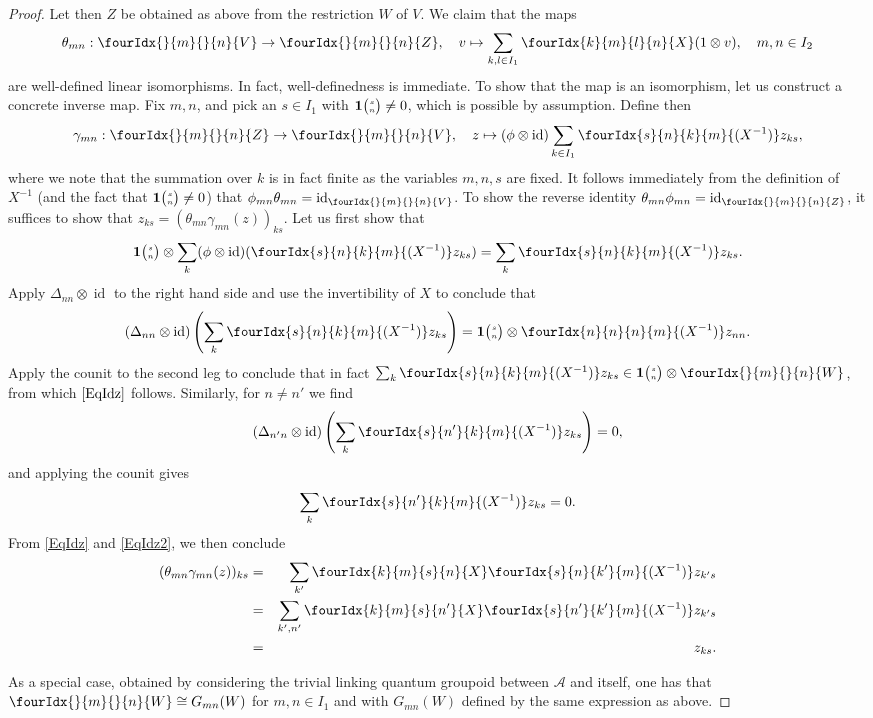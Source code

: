\documentclass[11pt]{article}
\DeclareMathOperator{\id}{id}
\newcommand{\Grt}[3]{#1{\tiny {\begin{pmatrix} #2\\#3\end{pmatrix}}}}
\newcommand{\UnitC}[2]{\Grt{\mathbf{1}}{#1}{#2}}
\newcommand{\Gr}[5]{\fourIdx{#2}{#4}{#3}{#5}{#1}}%
\newcommand{\Gru}[3]{\Gr{#1}{}{}{#2}{#3}}
\theoremstyle{definition}
\numberwithin{equation}{section}
\begin{document}
\begin{proof}
Let then $Z$ be obtained as above from the restriction $W$ of $V$. We claim that the maps \[\theta_{mn}:\Gru{V}{m}{n}\rightarrow \Gru{Z}{m}{n},\quad v \mapsto \sum_{k,l\in I_1} \Gr{X}{k}{l}{m}{n}(1\otimes v),\quad m,n\in I_2\]  are well-defined linear isomorphisms. In fact, well-definedness is immediate. To show that the map is an isomorphism, let us construct a concrete inverse map. Fix $m,n$, and pick an $s\in I_1$ with $\UnitC{s}{n}\neq 0$, which is possible by assumption. Define then \[\gamma_{mn}:\Gru{Z}{m}{n} \rightarrow \Gru{V}{m}{n},\quad z \mapsto (\phi\otimes \id)\sum_{k\in I_1} \Gr{(X^{-1})}{s}{k}{n}{m}z_{ks},\] where we note that the summation over $k$ is in fact finite as the variables $m,n,s$ are fixed. It follows immediately from the definition of $X^{-1}$ (and the fact that $\UnitC{s}{n}\neq 0$) that $\phi_{mn}\theta_{mn} = \id_{\Gru{V}{m}{n}}$. To show the reverse identity $\theta_{mn}\phi_{mn} = \id_{\Gru{Z}{m}{n}}$, it suffices to show that $z_{ks} = (\theta_{mn}\gamma_{mn}(z))_{ks}$. Let us first show that \begin{equation}\label{EqIdz} \UnitC{s}{n}\otimes \sum_k (\phi\otimes \id)(\Gr{(X^{-1})}{s}{k}{n}{m}z_{ks}) = \sum_k \Gr{(X^{-1})}{s}{k}{n}{m}z_{ks}.\end{equation} Apply $\Delta_{nn}\otimes \id$ to the right hand side and use the invertibility of $X$ to conclude that  \[(\Delta_{nn}\otimes \id)\left(\sum_k \Gr{(X^{-1})}{s}{k}{n}{m}z_{ks}\right) = \UnitC{s}{n}\otimes \Gr{(X^{-1})}{n}{n}{n}{m}z_{nn}.\] Apply the counit to the second leg to conclude that in fact $\sum_k \Gr{(X^{-1})}{s}{k}{n}{m}z_{ks} \in \UnitC{s}{n} \otimes \Gru{W}{m}{n}$, from which $\eqref{EqIdz}$ follows. Similarly, for $n\neq n'$ we find  \[(\Delta_{n'n}\otimes \id)\left(\sum_k \Gr{(X^{-1})}{s}{k}{n'}{m}z_{ks}\right) =0,\] and applying the counit gives \begin{equation}\label{EqIdz2} \sum_k \Gr{(X^{-1})}{s}{k}{n'}{m}z_{ks} =0.\end{equation} From \eqref{EqIdz} and \eqref{EqIdz2}, we then conclude 
\begin{eqnarray*} (\theta_{mn}\gamma_{mn}(z))_{ks} &=& \sum_{k'} \Gr{X}{k}{s}{m}{n}\Gr{(X^{-1})}{s}{k'}{n}{m}z_{k's} \\ &=& \sum_{k',n'} \Gr{X}{k}{s}{m}{n'}\Gr{(X^{-1})}{s}{k'}{n'}{m}z_{k's} \\ &=& z_{ks}.\end{eqnarray*} 

As a special case, obtained by considering the trivial linking quantum groupoid between $\mathscr{A}$ and itself, one has that $\Gru{W}{m}{n}\cong G_{mn}(W)$ for $m,n\in I_1$ and with $G_{mn}(W)$ defined by the same expression as above.


\end{proof}
\end{document}
